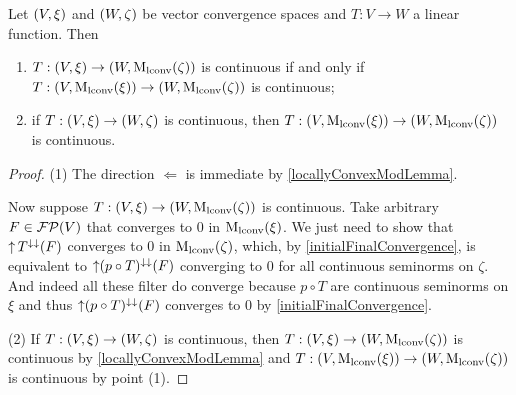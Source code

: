 \begin{proposition} \label{lconvContinuityLinearFunctions}
Let $\sSet{V,\xi}$ and $\sSet{W,\zeta}$ be vector convergence spaces and $T: V\to W$ a linear function. Then
\begin{enumerate}
\item $T: \sSet{V,\xi} \to \sSet{W, \lconvMod(\zeta)}$ is continuous \textup{if and only if} $T: \sSet{V,\lconvMod(\xi)} \to \sSet{W, \lconvMod(\zeta)}$ is continuous;
\item if $T: \sSet{V,\xi} \to \sSet{W, \zeta}$ is continuous, then $T: \sSet{V,\lconvMod(\xi)} \to \sSet{W, \lconvMod(\zeta)}$ is continuous.
\end{enumerate}
\end{proposition}
\begin{proof}
(1) The direction $\Leftarrow$ is immediate by \ref{locallyConvexModLemma}.

Now suppose $T: \sSet{V,\xi} \to \sSet{W, \lconvMod(\zeta)}$ is continuous. Take arbitrary $F\in \operatorname{\mathcal{FP}}(V)$ that converges to $0$ in $\operatorname{M_\text{lconv}}(\xi)$. We just need to show that $\operatorname{\uparrow} T^{\downarrow\downarrow}(F)$ converges to $0$ in $\operatorname{M_\text{lconv}}(\zeta)$, which, by \ref{initialFinalConvergence}, is equivalent to $\operatorname{\uparrow} (p\circ T)^{\downarrow\downarrow}(F)$ converging to $0$ for all continuous seminorms on $\zeta$. And indeed all these filter do converge because $p\circ T$ are continuous seminorms on $\xi$ and thus $\operatorname{\uparrow} (p\circ T)^{\downarrow\downarrow}(F)$ converges to $0$ by \ref{initialFinalConvergence}.

(2) If $T: \sSet{V,\xi} \to \sSet{W, \zeta}$ is continuous, then $T: \sSet{V,\xi} \to \sSet{W, \lconvMod(\zeta)}$ is continuous by \ref{locallyConvexModLemma} and $T: \sSet{V,\lconvMod(\xi)} \to \sSet{W, \lconvMod(\zeta)}$ is continuous by point (1).
\end{proof}

